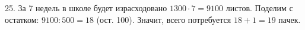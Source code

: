 25. За 7 недель в школе будет израсходовано $1300\cdot7=9100$ листов. Поделим с остатком: $9100:500=18$ (ост. 100). Значит, всего потребуется $18+1=19$ пачек.\\
